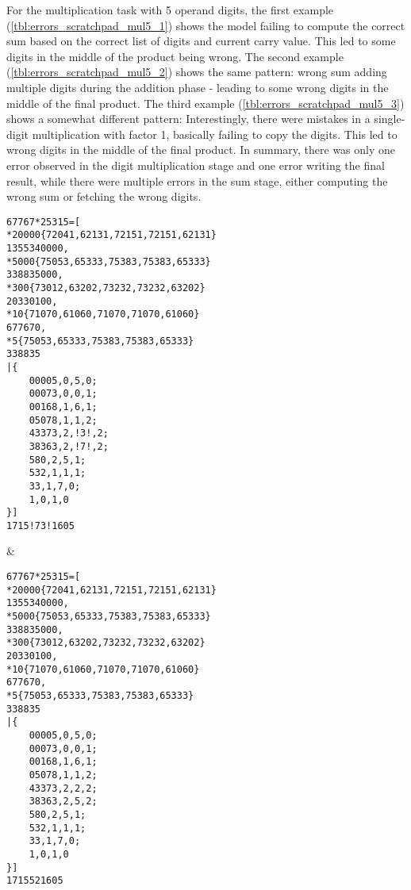 





\FloatBarrier

For the multiplication task with 5 operand digits, the first example (\cref{tbl:errors_scratchpad_mul5_1}) shows the model failing to compute the correct sum based on the correct list of digits and current carry value. This led to some digits in the middle of the product being wrong.
The second example  (\cref{tbl:errors_scratchpad_mul5_2}) shows the same pattern: wrong sum adding multiple digits during the addition phase - leading to some wrong digits in the middle of the final product.
The third example  (\cref{tbl:errors_scratchpad_mul5_3}) shows a somewhat different pattern: Interestingly, there were mistakes in a single-digit multiplication with factor 1, basically failing to copy the digits. This led to wrong digits in the middle of the final product.
In summary, there was only one error observed in the digit multiplication stage and one error writing the final result, while there were multiple errors in the sum stage, either computing the wrong sum or fetching the wrong digits.



\ErrorAnalysisTableBegin

\begin{lstlisting}
67767*25315=[
*20000{72041,62131,72151,72151,62131}
1355340000,
*5000{75053,65333,75383,75383,65333}
338835000,
*300{73012,63202,73232,73232,63202}
20330100,
*10{71070,61060,71070,71070,61060}
677670,
*5{75053,65333,75383,75383,65333}
338835
|{
	00005,0,5,0;
	00073,0,0,1;
	00168,1,6,1;
	05078,1,1,2;
	43373,2,!3!,2;
	38363,2,!7!,2;
	580,2,5,1;
	532,1,1,1;
	33,1,7,0;
	1,0,1,0
}]
1715!73!1605
\end{lstlisting} &
\begin{lstlisting}
67767*25315=[
*20000{72041,62131,72151,72151,62131}
1355340000,
*5000{75053,65333,75383,75383,65333}
338835000,
*300{73012,63202,73232,73232,63202}
20330100,
*10{71070,61060,71070,71070,61060}
677670,
*5{75053,65333,75383,75383,65333}
338835
|{
	00005,0,5,0;
	00073,0,0,1;
	00168,1,6,1;
	05078,1,1,2;
	43373,2,2,2;
	38363,2,5,2;
	580,2,5,1;
	532,1,1,1;
	33,1,7,0;
	1,0,1,0
}]
1715521605
\end{lstlisting} \\ \ErrorAnalysisTableRule
{}


